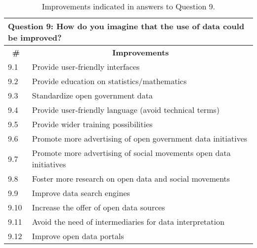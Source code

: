 \begin{table}[]
\ABNTEXfontereduzida
\caption{Improvements indicated in answers to Question 9.}
\label{tab:dl_results3}
\begin{tabular}{|l|l|}
\hline
\multicolumn{2}{|l|}{Question 9: How do you imagine that the use of data could be improved?}           \\ \hline
\multicolumn{1}{|c|}{\textbf{\#}} & \multicolumn{1}{c|}{\textbf{Improvements}}                         \\ \hline
9.1                               & Provide user-friendly interfaces                                   \\ \hline
9.2                               & Provide education on statistics/mathematics                        \\ \hline
9.3                               & Standardize open government data                                   \\ \hline
9.4                               & Provide user-friendly language (avoid technical terms)             \\ \hline
9.5                               & Provide wider training possibilities                               \\ \hline
9.6                               & Promote more advertising of open government data initiatives       \\ \hline
9.7                               & Promote more advertising of social movements open data initiatives \\ \hline
9.8                               & Foster more research on open data and social movements             \\ \hline
9.9                               & Improve data search engines                                        \\ \hline
9.10                              & Increase the offer of open data sources                            \\ \hline
9.11                              & Avoid the need of intermediaries for data interpretation           \\ \hline
9.12                              & Improve open data portals                                          \\ \hline
\end{tabular}
\end{table}

